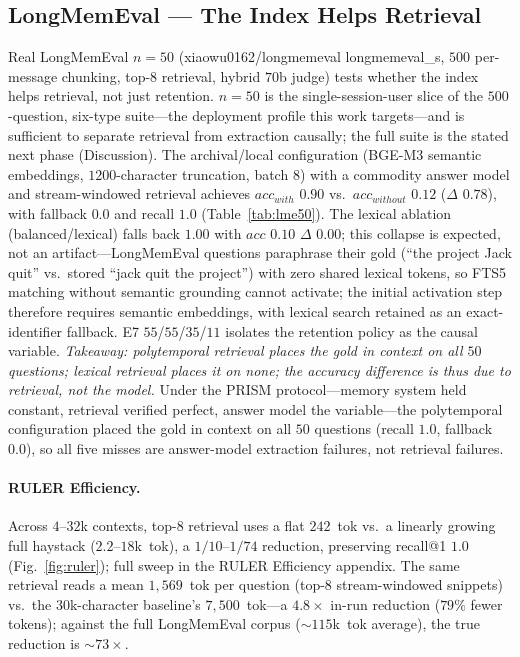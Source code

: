 \documentclass[letterpaper]{article}
\begin{document}
\subsection{LongMemEval --- The Index Helps Retrieval}
Real LongMemEval $n{=}50$ (xiaowu0162/longmemeval longmemeval\_s, $500$ per-message chunking, top-$8$ retrieval, hybrid $70$b judge) tests whether the index helps retrieval, not just retention. $n{=}50$ is the single-session-user slice of the $500$-question, six-type suite---the deployment profile this work targets---and is sufficient to separate retrieval from extraction causally; the full suite is the stated next phase (Discussion). The archival/local configuration (BGE-M3 semantic embeddings, $1200$-character truncation, batch $8$) with a commodity answer model and stream-windowed retrieval achieves $acc_{with}$ $0.90$ vs.\ $acc_{without}$ $0.12$ ($\Delta$ $0.78$), with fallback $0.0$ and recall $1.0$ (Table~\ref{tab:lme50}). The lexical ablation (balanced/lexical) falls back $1.00$ with $acc$ $0.10$ $\Delta$ $0.00$; this collapse is expected, not an artifact---LongMemEval questions paraphrase their gold (``the project Jack quit'' vs.\ stored ``jack quit the project'') with zero shared lexical tokens, so FTS5 matching without semantic grounding cannot activate; the initial activation step therefore requires semantic embeddings, with lexical search retained as an exact-identifier fallback. E7 $55$/$55$/$35$/$11$ isolates the retention policy as the causal variable. \emph{Takeaway: polytemporal retrieval places the gold in context on all $50$ questions; lexical retrieval places it on none; the accuracy difference is thus due to retrieval, not the model.} Under the PRISM protocol---memory system held constant, retrieval verified perfect, answer model the variable---the polytemporal configuration placed the gold in context on all $50$ questions (recall $1.0$, fallback $0.0$), so all five misses are answer-model extraction failures, not retrieval failures.



\paragraph{RULER Efficiency.} Across $4$--$32$k contexts, top-$8$ retrieval uses a flat $242$~tok vs.\ a linearly growing full haystack ($2.2$--$18$k~tok), a $1/10$--$1/74$ reduction, preserving recall@1 $1.0$ (Fig.~\ref{fig:ruler}); full sweep in the RULER Efficiency appendix. The same retrieval reads a mean $1{,}569$~tok per question (top-8 stream-windowed snippets) vs.\ the $30$k-character baseline's $7{,}500$~tok---a $4.8\times$ in-run reduction ($79\%$ fewer tokens); against the full LongMemEval corpus ($\sim115$k~tok average), the true reduction is $\sim73\times$.
\end{document}
